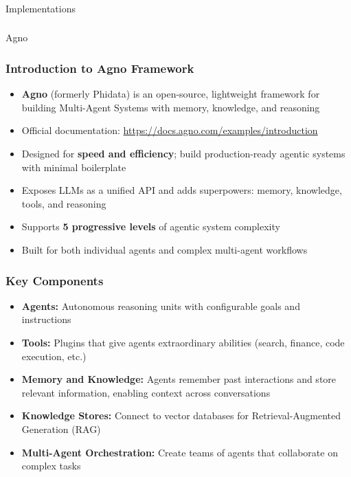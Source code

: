 \begin{frame}[fragile]\frametitle{}
\begin{center}
{\Large Implementations}
\end{center}
\end{frame}

\begin{frame}[fragile]\frametitle{}
\begin{center}
{\Large Agno}
\end{center}
\end{frame}

\begin{frame}[fragile]\frametitle{Introduction to Agno Framework}
      \begin{itemize}
        \item \textbf{Agno} (formerly Phidata) is an open-source, lightweight framework for building Multi-Agent Systems with memory, knowledge, and reasoning
        \item Official documentation: \url{https://docs.agno.com/examples/introduction}
        \item Designed for \textbf{speed and efficiency}; build production-ready agentic systems with minimal boilerplate
        \item Exposes LLMs as a unified API and adds superpowers: memory, knowledge, tools, and reasoning
        \item Supports \textbf{5 progressive levels} of agentic system complexity
        \item Built for both individual agents and complex multi-agent workflows
      \end{itemize}
\end{frame}

\begin{frame}[fragile]\frametitle{Key Components}
    \begin{itemize}
        \item \textbf{Agents:} Autonomous reasoning units with configurable goals and instructions
        \item \textbf{Tools:} Plugins that give agents extraordinary abilities (search, finance, code execution, etc.)
        \item \textbf{Memory and Knowledge:} Agents remember past interactions and store relevant information, enabling context across conversations
        \item \textbf{Knowledge Stores:} Connect to vector databases for Retrieval-Augmented Generation (RAG)
        \item \textbf{Multi-Agent Orchestration:} Create teams of agents that collaborate on complex tasks
    \end{itemize}
\end{frame}

